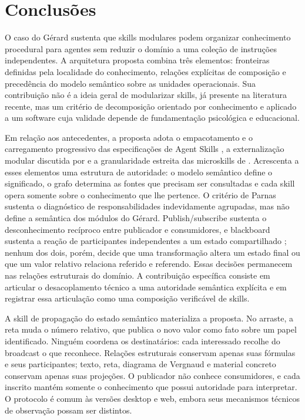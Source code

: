 \documentclass[preprint,12pt,authoryear]{elsarticle}
\newcommand{\gerard}{Gérard\xspace}
\begin{document}
\section{Conclusões}
O caso do \gerard{} sustenta que skills modulares podem organizar conhecimento procedural para agentes sem reduzir o domínio a uma coleção de instruções independentes. A arquitetura proposta combina três elementos: fronteiras definidas pela localidade do conhecimento, relações explícitas de composição e precedência do modelo semântico sobre as unidades operacionais. Sua contribuição não é a ideia geral de modularizar skills, já presente na literatura recente, mas um critério de decomposição orientado por conhecimento e aplicado a um software cuja validade depende de fundamentação psicológica e educacional.

Em relação aos antecedentes, a proposta adota o empacotamento e o carregamento progressivo das especificações de Agent Skills \citep{openai2026skills,microsoft2026skills}, a externalização modular discutida por \citet{badhe2026survey} e a granularidade estreita das microskills de \citet{zare2026microskill}. Acrescenta a esses elementos uma estrutura de autoridade: o modelo semântico define o significado, o grafo determina as fontes que precisam ser consultadas e cada skill opera somente sobre o conhecimento que lhe pertence. O critério de Parnas sustenta o diagnóstico de responsabilidades indevidamente agrupadas, mas não define a semântica dos módulos do \gerard \citep{parnas1972criteria}. Publish/subscribe sustenta o desconhecimento recíproco entre publicador e consumidores, e blackboard sustenta a reação de participantes independentes a um estado compartilhado \citep{eugster2003many,nii1986blackboard}; nenhum dos dois, porém, decide que uma transformação altera um estado final ou que um valor relativo relaciona referido e referendo. Essas decisões permanecem nas relações estruturais do domínio. A contribuição específica consiste em articular o desacoplamento técnico a uma autoridade semântica explícita e em registrar essa articulação como uma composição verificável de skills.

A skill de propagação do estado semântico materializa a proposta. No arraste, a reta muda o número relativo, que publica o novo valor como fato sobre um papel identificado. Ninguém coordena os destinatários: cada interessado recolhe do broadcast o que reconhece. Relações estruturais conservam apenas suas fórmulas e seus participantes; texto, reta, diagrama de Vergnaud e material concreto conservam apenas suas projeções. O publicador não conhece consumidores, e cada inscrito mantém somente o conhecimento que possui autoridade para interpretar. O protocolo é comum às versões desktop e web, embora seus mecanismos técnicos de observação possam ser distintos.
\end{document}

